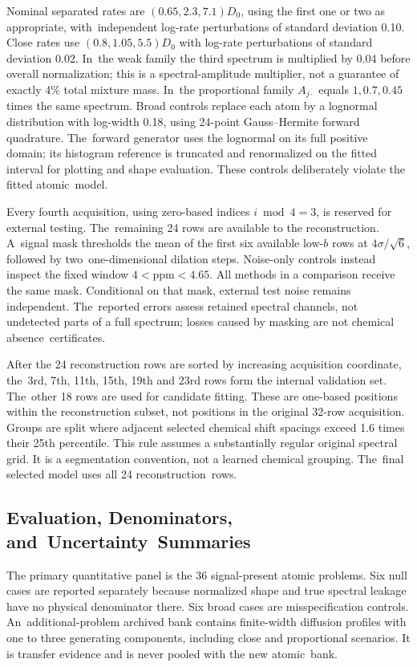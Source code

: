 \documentclass[mathematics,article,accept,moreauthors]{Definitions/mdpi}
\begin{document}
Nominal separated rates are $(0.65,2.3,7.1)D_0$, using the first one or two as appropriate, with~independent log-rate perturbations of standard deviation 0.10. Close rates use $(0.8,1.05,5.5)D_0$ with log-rate perturbations of standard deviation 0.02. In~the weak family the third spectrum is multiplied by 0.04 before overall normalization; this is a spectral-amplitude multiplier, not a guarantee of exactly 4\% total mixture mass. In~the proportional family $A_{j\cdot}$ equals $1,0.7,0.45$ times the same spectrum. Broad controls replace each atom by a lognormal distribution with log-width 0.18, using 24-point Gauss--Hermite forward quadrature. The~forward generator uses the lognormal on its full positive domain; its histogram reference is truncated and renormalized on the fitted interval for plotting and shape evaluation. These controls deliberately violate the fitted atomic~model.

Every fourth acquisition, using zero-based indices $i\bmod4=3$, is reserved for external testing. The~remaining 24 rows are available to the reconstruction. A~signal mask thresholds the mean of the first six available low-$b$ rows at $4\sigma/\sqrt6$, followed by \mbox{two one-dimensional} dilation steps. Noise-only controls instead inspect the fixed window $4<\mathrm{ppm}<4.65$. All methods in a comparison receive the same mask. Conditional on that mask, external test noise remains independent. The~reported errors assess retained spectral channels, not undetected parts of a full spectrum; losses caused by masking are not chemical \mbox{absence~certificates.}

After the 24 reconstruction rows are sorted by increasing acquisition coordinate, the~3rd, 7th, 11th, 15th, 19th and 23rd rows form the internal validation set. The~other 18 rows are used for candidate fitting. These are one-based positions within the reconstruction subset, not positions in the original 32-row acquisition. Groups are split where adjacent selected chemical shift spacings exceed 1.6 times their 25th percentile. This rule assumes a substantially regular original spectral grid. It is a segmentation convention, not a learned chemical grouping. The~final selected model uses all 24 reconstruction~rows.

\subsection{Evaluation, Denominators, and~Uncertainty~Summaries}
The primary quantitative panel is the 36 signal-present atomic problems. Six null cases are reported separately because normalized shape and true spectral leakage have no physical denominator there. Six broad cases are misspecification controls. An~additional-problem archived bank contains finite-width diffusion profiles with one to three generating components, including close and proportional scenarios. It is transfer evidence and is never pooled with the new atomic~bank.
\end{document}
